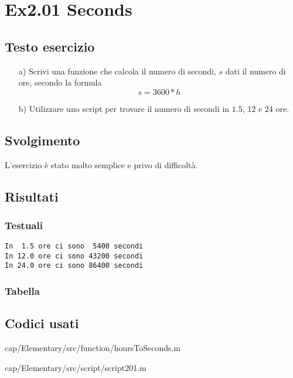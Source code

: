 \section{Ex2.01 Seconds}\label{sec:seconds}
\subsection{Testo esercizio}
\begin{itemize}
    \item[a)] Scrivi una funzione che calcola il numero di secondi, $s$ dati il 
    numero di ore, secondo la formula $$s = 3600*h$$
    
    \item[b)] Utilizzare uno script per trovare il numero di secondi in $1.5$, 
    $12$ e $24$ ore.
\end{itemize}

\subsection{Svolgimento}
L'esercizio è stato molto semplice e privo di difficoltà.

\subsection{Risultati}
\subsubsection{Testuali} 
\color{gray}\begin{verbatim}
In  1.5 ore ci sono  5400 secondi
In 12.0 ore ci sono 43200 secondi
In 24.0 ore ci sono 86400 secondi
\end{verbatim}
\color{black}

\subsubsection{Tabella}    

\newpage

\subsection{Codici usati}

{cap/Elementary/src/function/hoursToSeconds.m}%


{cap/Elementary/src/script/script201.m}

